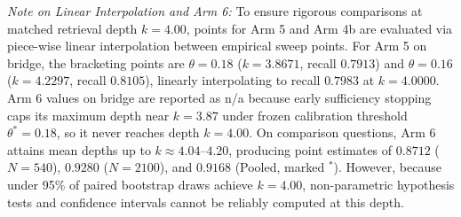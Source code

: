 \documentclass[conference]{IEEEtran}
\begin{document}
\begin{table}[t]
\centering
\caption{Matched-Depth Paragraph Recall at Exact Mean Depth $k=4.00$ Across Evaluation Cohorts}
\label{tab:matched_depth}
\vspace{1ex}
\begin{flushleft}
\footnotesize \textit{Note on Linear Interpolation and Arm 6:} To ensure rigorous comparisons at matched retrieval depth $k=4.00$, points for Arm 5 and Arm 4b are evaluated via piece-wise linear interpolation between empirical sweep points. For Arm 5 on bridge, the bracketing points are $\theta=0.18$ ($k=3.8671$, recall $0.7913$) and $\theta=0.16$ ($k=4.2297$, recall $0.8105$), linearly interpolating to recall $0.7983$ at $k=4.0000$. Arm 6 values on bridge are reported as n/a because early sufficiency stopping caps its maximum depth near $k=3.87$ under frozen calibration threshold $\theta^*=0.18$, so it never reaches depth $k=4.00$. On comparison questions, Arm 6 attains mean depths up to $k \approx 4.04\text{--}4.20$, producing point estimates of $0.8712$ ($N=540$), $0.9280$ ($N=2100$), and $0.9168$ (Pooled, marked $^*$). However, because under 95\% of paired bootstrap draws achieve $k=4.00$, non-parametric hypothesis tests and confidence intervals cannot be reliably computed at this depth.
\end{flushleft}
\end{table}
\end{document}
